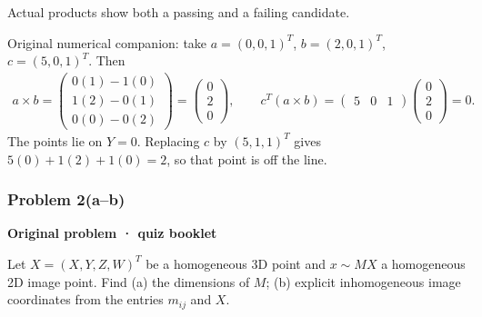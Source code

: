 \documentclass[letterpaper,11pt,english,openany,oneside]{jupyterBook}
\begin{document}
\sphinxAtStartPar
{} Actual products show both a passing and a failing candidate.

\sphinxAtStartPar
Original numerical companion: take {\color{QuizMathBlue} \(a=(0,0,1)^T\)}, {\color{QuizMathBlue} \(b=(2,0,1)^T\)}, {\color{QuizMathBlue} \(c=(5,0,1)^T\)}. Then
{\color{QuizMathBlue} \begin{equation*}
\begin{split}
a\times b=\begin{pmatrix}0(1)-1(0)\\1(2)-0(1)\\0(0)-0(2)\end{pmatrix}
=\begin{pmatrix}0\\2\\0\end{pmatrix},\qquad
c^T(a\times b)=\begin{pmatrix}5&0&1\end{pmatrix}\begin{pmatrix}0\\2\\0\end{pmatrix}=0.
\end{split}
\end{equation*}}
\sphinxAtStartPar
The points lie on {\color{QuizMathBlue} \(Y=0\)}. Replacing {\color{QuizMathBlue} \(c\)} by {\color{QuizMathBlue} \((5,1,1)^T\)} gives {\color{QuizMathBlue} \(5(0)+1(2)+1(0)=2\)}, so that point is off the line.

\par


\subsubsection{Problem 2(a–b)}
\label{\detokenize{lectures/lecture02/quiz-workbook:problem-2-ab}}\label{\detokenize{lectures/lecture02/quiz-workbook:quiz-8-q2}}\label{\detokenize{lectures/lecture02/quiz-workbook:ex-lec02-projection}}
\par\medskip\textbf{Original problem · quiz booklet}\par\smallskip

\sphinxAtStartPar
Let \(X=(X,Y,Z,W)^T\) be a homogeneous 3D point and \(x\sim MX\) a homogeneous 2D image point. Find (a) the dimensions of \(M\); (b) explicit inhomogeneous image coordinates from the entries \(m_{ij}\) and \(X\).

\par\medskip
\end{document}
